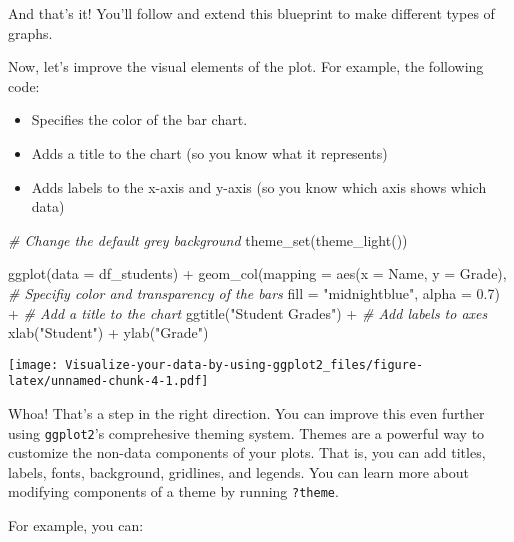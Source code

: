 \documentclass[
]{article}
\newenvironment{Shaded}{\begin{snugshade}}{\end{snugshade}}
\newcommand{\AttributeTok}[1]{\textcolor[rgb]{0.77,0.63,0.00}{#1}}
\newcommand{\CommentTok}[1]{\textcolor[rgb]{0.56,0.35,0.01}{\textit{#1}}}
\newcommand{\FloatTok}[1]{\textcolor[rgb]{0.00,0.00,0.81}{#1}}
\newcommand{\FunctionTok}[1]{\textcolor[rgb]{0.00,0.00,0.00}{#1}}
\newcommand{\NormalTok}[1]{#1}
\newcommand{\SpecialCharTok}[1]{\textcolor[rgb]{0.00,0.00,0.00}{#1}}
\newcommand{\StringTok}[1]{\textcolor[rgb]{0.31,0.60,0.02}{#1}}
\providecommand{\tightlist}{%
  \setlength{\itemsep}{0pt}\setlength{\parskip}{0pt}}
\begin{document}
And that's it! You'll follow and extend this blueprint to make different
types of graphs.

Now, let's improve the visual elements of the plot. For example, the
following code:

\begin{itemize}
\tightlist
\item
  Specifies the color of the bar chart.
\item
  Adds a title to the chart (so you know what it represents)
\item
  Adds labels to the x-axis and y-axis (so you know which axis shows
  which data)
\end{itemize}

\begin{Shaded}
\begin{Highlighting}[]
\CommentTok{\# Change the default grey background}
\FunctionTok{theme\_set}\NormalTok{(}\FunctionTok{theme\_light}\NormalTok{())}


\FunctionTok{ggplot}\NormalTok{(}\AttributeTok{data =}\NormalTok{ df\_students) }\SpecialCharTok{+}
  \FunctionTok{geom\_col}\NormalTok{(}\AttributeTok{mapping =} \FunctionTok{aes}\NormalTok{(}\AttributeTok{x =}\NormalTok{ Name, }\AttributeTok{y =}\NormalTok{ Grade),}
           \CommentTok{\# Specifiy color and transparency of the bars}
           \AttributeTok{fill =} \StringTok{"midnightblue"}\NormalTok{, }\AttributeTok{alpha =} \FloatTok{0.7}\NormalTok{) }\SpecialCharTok{+}
  \CommentTok{\# Add a title to the chart}
  \FunctionTok{ggtitle}\NormalTok{(}\StringTok{"Student Grades"}\NormalTok{) }\SpecialCharTok{+}
  \CommentTok{\# Add labels to axes}
  \FunctionTok{xlab}\NormalTok{(}\StringTok{"Student"}\NormalTok{) }\SpecialCharTok{+}
  \FunctionTok{ylab}\NormalTok{(}\StringTok{"Grade"}\NormalTok{)}
\end{Highlighting}
\end{Shaded}

\texttt{[image: Visualize-your-data-by-using-ggplot2\_files/figure-latex/unnamed-chunk-4-1.pdf]}

Whoa! That's a step in the right direction. You can improve this even
further using \texttt{ggplot2}'s comprehesive theming system. Themes are
a powerful way to customize the non-data components of your plots. That
is, you can add titles, labels, fonts, background, gridlines, and
legends. You can learn more about modifying components of a theme by
running \texttt{?theme}.

For example, you can:
\end{document}
